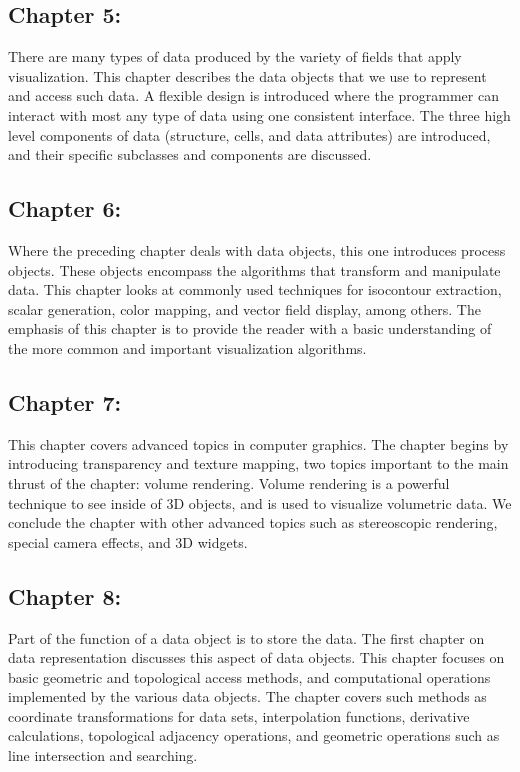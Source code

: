 \subsection*{Chapter 5: }

There are many types of data produced by the variety of fields that apply visualization. This chapter describes the data objects that we use to represent and access such data. A flexible design is introduced where the programmer can interact with most any type of data using one consistent interface. The three high level components of data (structure, cells, and data attributes) are introduced, and their specific subclasses and components are discussed.

\subsection*{Chapter 6: }

Where the preceding chapter deals with data objects, this one introduces process objects. These objects encompass the algorithms that transform and manipulate data. This chapter looks at commonly used techniques for isocontour extraction, scalar generation, color mapping, and vector field display, among others. The emphasis of this chapter is to provide the reader with a basic understanding of the more common and important visualization algorithms.

\subsection*{Chapter 7:  }

This chapter covers advanced topics in computer graphics. The chapter begins by introducing transparency and texture mapping, two topics important to the main thrust of the chapter: volume rendering. Volume rendering is a powerful technique to see inside of 3D objects, and is used to visualize volumetric data. We conclude the chapter with other advanced topics such as stereoscopic rendering, special camera effects, and 3D widgets.

\subsection*{Chapter 8: }

Part of the function of a data object is to store the data. The first chapter on data representation discusses this aspect of data objects. This chapter focuses on basic geometric and topological access methods, and computational operations implemented by the various data objects. The chapter covers such methods as coordinate transformations for data sets, interpolation functions, derivative calculations, topological adjacency operations, and geometric operations such as line intersection and searching.

